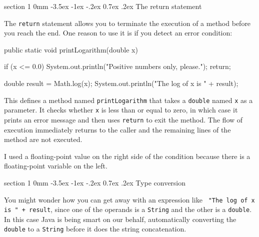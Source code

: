 \documentclass{book}
\makeatletter
\renewcommand{\section}{\@startsection 
    {section} {1} {0mm}%
    {-3.5ex \@plus -1ex \@minus -.2ex}%
    {0.7ex \@plus.2ex}%
    {\normalfont\Large\bfseries}}
\makeatother
\begin{document}
\section{The return statement}

The {\tt return} statement allows you to terminate the execution
of a method before you reach the end.  One reason to use it
is if you detect an error condition:

\begin{verbatimtab}
  public static void printLogarithm(double x) {
    if (x <= 0.0) {
      System.out.println("Positive numbers only, please.");
      return;
    }

    double result = Math.log(x);
    System.out.println("The log of x is " + result);
  }
\end{verbatimtab}
%
This defines a method named {\tt printLogarithm} that takes a
{\tt  double} named {\tt x} as a parameter.  It checks whether
{\tt  x} is less than or equal to zero, in which case it prints an error
message and then uses {\tt return} to exit the method.  The flow of
execution immediately returns to the caller and the remaining lines of
the method are not executed.

I used a floating-point value on the right side of the condition
because there is a floating-point variable on the left.


\section {Type conversion}

You might wonder how you can get away with an expression like {\tt
"The log of x is " + result}, since one of the operands is a {\tt String}
and the other is a {\tt double}.  In this case Java is being
smart on our behalf, automatically converting the {\tt double} to a
{\tt String} before it does the string concatenation.


\end{document}
